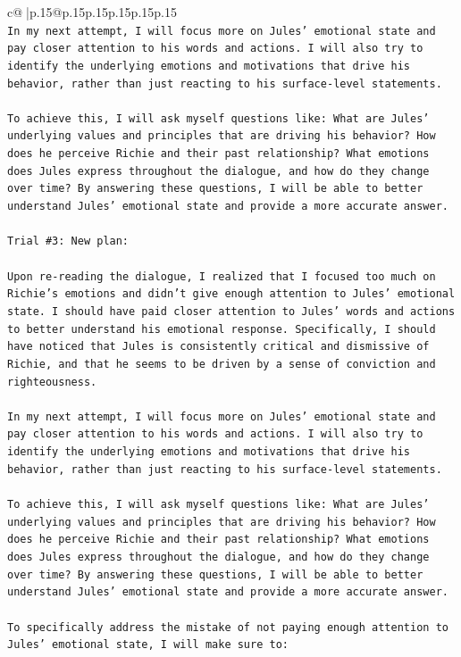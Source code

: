 \documentclass{article}
\begin{document}
{\begin{supertabular}{c@{$\;$}|p{.15\linewidth}@{}p{.15\linewidth}p{.15\linewidth}p{.15\linewidth}p{.15\linewidth}p{.15\linewidth}}
{{{\\ 
\texttt{In my next attempt, I will focus more on Jules' emotional state and pay closer attention to his words and actions. I will also try to identify the underlying emotions and motivations that drive his behavior, rather than just reacting to his surface{-}level statements. } \\
\\ 
\texttt{To achieve this, I will ask myself questions like: What are Jules' underlying values and principles that are driving his behavior? How does he perceive Richie and their past relationship? What emotions does Jules express throughout the dialogue, and how do they change over time? By answering these questions, I will be able to better understand Jules' emotional state and provide a more accurate answer.} \\
\\ 
\texttt{Trial \#3: New plan: } \\
\\ 
\texttt{Upon re{-}reading the dialogue, I realized that I focused too much on Richie's emotions and didn't give enough attention to Jules' emotional state. I should have paid closer attention to Jules' words and actions to better understand his emotional response. Specifically, I should have noticed that Jules is consistently critical and dismissive of Richie, and that he seems to be driven by a sense of conviction and righteousness. } \\
\\ 
\texttt{In my next attempt, I will focus more on Jules' emotional state and pay closer attention to his words and actions. I will also try to identify the underlying emotions and motivations that drive his behavior, rather than just reacting to his surface{-}level statements. } \\
\\ 
\texttt{To achieve this, I will ask myself questions like: What are Jules' underlying values and principles that are driving his behavior? How does he perceive Richie and their past relationship? What emotions does Jules express throughout the dialogue, and how do they change over time? By answering these questions, I will be able to better understand Jules' emotional state and provide a more accurate answer.} \\
\\ 
\texttt{To specifically address the mistake of not paying enough attention to Jules' emotional state, I will make sure to:} \\
\\ 
}}}
\end{supertabular}}
\end{document}

